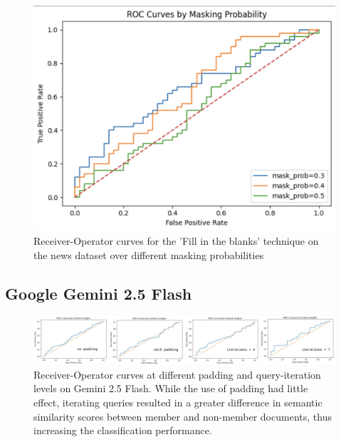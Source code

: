 \documentclass[sigconf]{acmart}
\begin{document}
\begin{figure}[htp]
  \centering
  \includegraphics[width=\columnwidth]{figures/roc_gpt_masking_prob.png}
    \caption{Receiver-Operator curves for the 'Fill in the blanks' technique on the news dataset over different masking probabilities}
    \label{fig:roc-news-mask-prob}
\end{figure}


\subsection{Google Gemini 2.5 Flash}

\begin{figure}[htp]
  \centering
  \includegraphics[width=\textwidth]{figures/gemini_collage.png}
    \caption{Receiver-Operator curves at different padding and query-iteration levels on Gemini 2.5 Flash. While the use of padding had little effect, iterating queries resulted in a greater difference in semantic similarity scores between member and non-member documents, thus increasing the classification performance.}
    \label{fig:roc_gemini_collage}
\end{figure}
\end{document}

